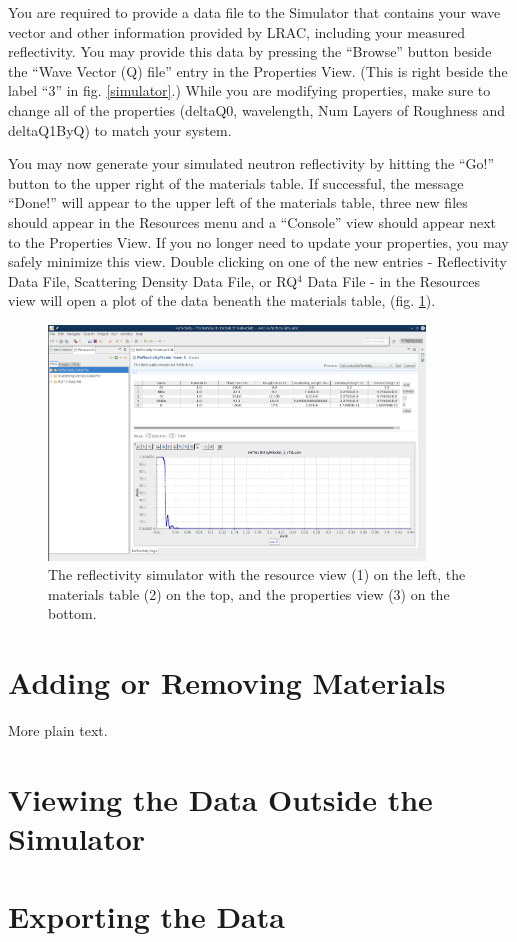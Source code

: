 You are required to provide a data file to the Simulator that contains your wave
vector and other information provided by LRAC, including your measured
reflectivity. You may provide this data by pressing the ``Browse'' button beside
the ``Wave Vector (Q) file'' entry in the Properties View. (This is right beside
the label ``3'' in fig. \ref{simulator}.) While you are modifying properties,
make sure to change all of the properties (deltaQ0, wavelength, Num Layers of
Roughness and deltaQ1ByQ) to match your system.

You may now generate your simulated neutron reflectivity by hitting the ``Go!''
button to the upper right of the materials table. If successful, the message
``Done!'' will appear to the upper left of the materials table, three new files
should appear in the Resources menu and a ``Console'' view should appear next to
the Properties View. If you no longer need to update your properties, you may
safely minimize this view. Double clicking on one of the new entries -
Reflectivity Data File, Scattering Density Data File, or RQ$^4$ Data File - in
the Resources view will open a plot of the data beneath the materials table, (fig.
\ref{simulatorPost}).

\begin{figure}[!h]
\centering
\includegraphics[width=10cm]{images/simulatorProcessed.png}
\caption{The reflectivity simulator with the resource view (1) on the left, the
materials table (2) on the top, and the properties view (3) on the bottom.}
\label{simulatorPost}
\end{figure}


\section{Adding or Removing Materials}
\label{modifyMaterials}

More plain text.

\section{Viewing the Data Outside the Simulator}
\label{viz}

\section{Exporting the Data}
\label{export}
